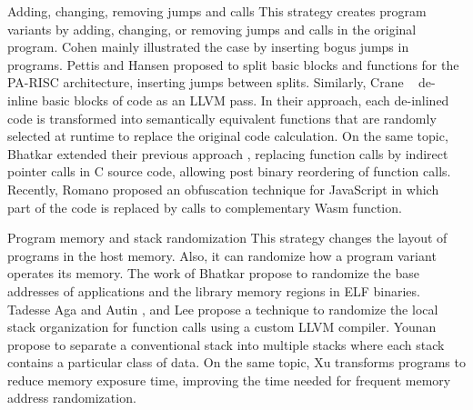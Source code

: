 \begin{strategy}{Adding, changing, removing jumps and calls}
    \label{strategy:S3}
    \normalfont
    This strategy creates program variants by adding, changing, or removing jumps and calls in the original program. Cohen \cite{cohen1993operating} mainly illustrated the case by inserting bogus jumps in programs. Pettis and Hansen \cite{pettisochhansen} proposed to split basic blocks and functions for the PA-RISC architecture, inserting jumps between splits.
    Similarly, Crane \etal~\cite{crane2015thwarting} de-inline basic blocks of code as an LLVM pass. In their approach, each de-inlined code is transformed into semantically equivalent functions that are randomly selected at runtime to replace the original code calculation. On the same topic, Bhatkar \etal \cite{bhatkar2005efficient} extended their previous approach \cite{bhatkar03}, replacing function calls by indirect pointer calls in C source code, allowing post binary reordering of function calls. Recently, Romano \etal \cite{wobfuscator} proposed an obfuscation technique for JavaScript in which part of the code is replaced by calls to complementary Wasm function.
\end{strategy}


\begin{strategy}{Program memory and stack randomization}
    \label{strategy:S4}
    \normalfont
    This strategy changes the layout of programs in the host memory. Also, it can randomize how a program variant operates its memory. The work of Bhatkar \etal \cite{bhatkar03, bhatkar2005efficient} propose to randomize the base addresses of applications and the library memory regions in ELF binaries. Tadesse Aga and Autin \cite{aga2019smokestack}, and Lee \etal \cite{lee2021savior} propose a technique to randomize the local stack organization for function calls using a custom LLVM compiler.
    Younan \etal \cite{Younan2006} propose to separate a conventional stack into multiple stacks where each stack contains a particular class of
    data. 
    On the same topic, Xu \etal \cite{xu2020merr} transforms programs to reduce memory exposure time, improving the time needed for frequent memory address randomization. 
\end{strategy}


